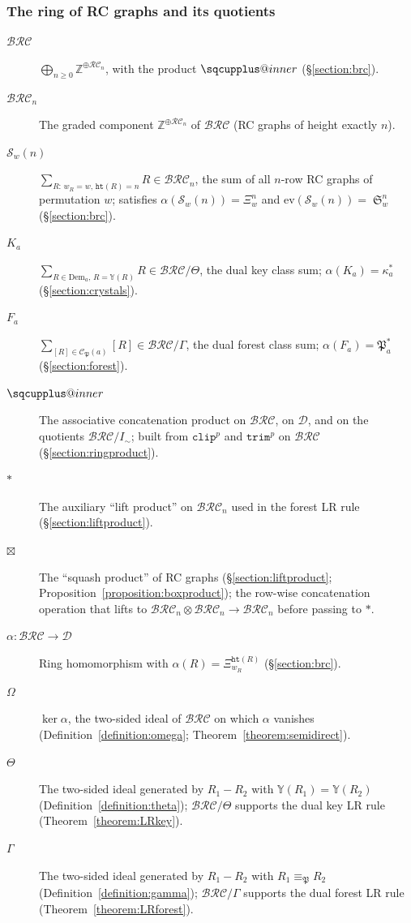 \documentclass[a4paper,fleqn]{cas-sc}
\makeatletter
\newcommand{\sqcupplus@inner}[2]{%
  \vcenter{\hbox{\ooalign{%
    \hfil$\m@th#1\sqcup$\hfil\cr
    \hfil\raisebox{0.15ex}{$\m@th#1\scriptscriptstyle+$}\hfil\cr
  }}}%
}
\newcommand{\sqcupplus}{\mathbin{\mathpalette\sqcupplus@inner\relax}}
\theoremstyle{definition}
\theoremstyle{remark}
\numberwithin{equation}{subsection}
\DeclareMathOperator{\sch}{\mathfrak{S}}
\newcommand{\wof}[1]{w_{#1}}
\newcommand{\trm}{\mathtt{trim}}
\newcommand{\hr}{\mathtt{ht}}
\newcommand{\clp}{\mathtt{clip}}
\newcommand{\BRC}{\mathcal{BRC}}
\newcommand{\RC}{\mathcal{RC}}
\newcommand{\dsch}{\ensuremath{\Xi}}
\newcommand{\dcoma}{\mathcal{D}}
\newcommand{\forest}{\mathfrak{P}}
\makeatother
\begin{document}
\subsubsection*{The ring of RC graphs and its quotients}
\begin{description}
\item[$\BRC$] $\bigoplus_{n\geq 0}\mathbb{Z}^{\oplus\RC_n}$, with the product $\sqcupplus$ (\S\ref{section:brc}).
\item[$\BRC_n$] The graded component $\mathbb{Z}^{\oplus \RC_n}$ of $\BRC$ (RC graphs of height exactly $n$).
\item[$\mathcal{S}_w(n)$] $\sum_{R:\,\wof{R}=w,\,\hr(R)=n}R\in\BRC_n$, the sum of all $n$-row RC graphs of permutation $w$; satisfies $\alpha(\mathcal{S}_w(n))=\dsch_w^n$ and $\mathrm{ev}(\mathcal{S}_w(n))=\sch_w^n$ (\S\ref{section:brc}).
\item[$K_a$] $\sum_{R\in\mathrm{Dem}_a,\,R=\mathbb{Y}(R)} R\in\BRC/\Theta$, the dual key class sum; $\alpha(K_a)=\kappa_a^*$ (\S\ref{section:crystals}).
\item[$F_a$] $\sum_{[R]\in\mathcal{C}_\forest(a)}[R]\in\BRC/\Gamma$, the dual forest class sum; $\alpha(F_a)=\forest_a^*$ (\S\ref{section:forest}).
\item[$\sqcupplus$] The associative concatenation product on $\BRC$, on $\dcoma$, and on the quotients $\BRC/I_\sim$; built from $\clp^p$ and $\trm^p$ on $\BRC$ (\S\ref{section:ringproduct}).
\item[$*$] The auxiliary ``lift product'' on $\BRC_n$ used in the forest LR rule (\S\ref{section:liftproduct}).
\item[$\boxtimes$] The ``squash product'' of RC graphs (\S\ref{section:liftproduct}; Proposition~\ref{proposition:boxproduct}); the row-wise concatenation operation that lifts to $\BRC_n\otimes\BRC_n\to\BRC_n$ before passing to $*$.
\item[$\alpha:\BRC\to\dcoma$] Ring homomorphism with $\alpha(R)=\dsch_{\wof{R}}^{\hr(R)}$ (\S\ref{section:brc}).
\item[$\Omega$] $\ker\alpha$, the two-sided ideal of $\BRC$ on which $\alpha$ vanishes (Definition~\ref{definition:omega}; Theorem~\ref{theorem:semidirect}).
\item[$\Theta$] The two-sided ideal generated by $R_1-R_2$ with $\mathbb{Y}(R_1)=\mathbb{Y}(R_2)$ (Definition~\ref{definition:theta}); $\BRC/\Theta$ supports the dual key LR rule (Theorem~\ref{theorem:LRkey}).
\item[$\Gamma$] The two-sided ideal generated by $R_1-R_2$ with $R_1\equiv_\forest R_2$ (Definition~\ref{definition:gamma}); $\BRC/\Gamma$ supports the dual forest LR rule (Theorem~\ref{theorem:LRforest}).

\end{description}
\end{document}
